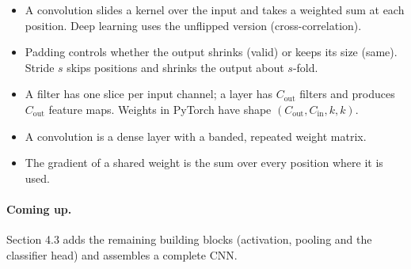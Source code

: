 \documentclass[12pt, a4paper]{article}
\begin{document}
\begin{itemize}
  \item A convolution slides a kernel over the input and takes a weighted sum
        at each position. Deep learning uses the unflipped version
        (cross-correlation).
  \item Padding controls whether the output shrinks (valid) or keeps its size
        (same). Stride $s$ skips positions and shrinks the output about
        $s$-fold.
  \item A filter has one slice per input channel; a layer has $C_{\text{out}}$
        filters and produces $C_{\text{out}}$ feature maps. Weights in PyTorch
        have shape $(C_{\text{out}}, C_{\text{in}}, k, k)$.
  \item A convolution is a dense layer with a banded, repeated weight matrix.
  \item The gradient of a shared weight is the sum over every position where
        it is used.
\end{itemize}

\paragraph{Coming up.}
Section 4.3 adds the remaining building blocks (activation, pooling and the
classifier head) and assembles a complete CNN.
\end{document}
